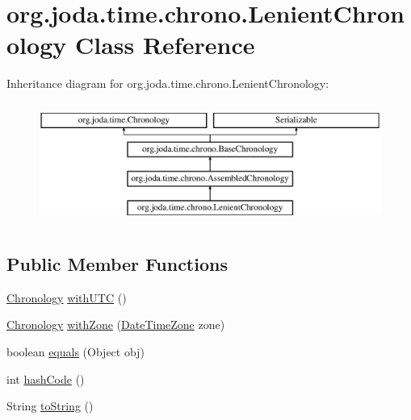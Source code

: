 \hypertarget{classorg_1_1joda_1_1time_1_1chrono_1_1_lenient_chronology}{\section{org.\-joda.\-time.\-chrono.\-Lenient\-Chronology Class Reference}
\label{classorg_1_1joda_1_1time_1_1chrono_1_1_lenient_chronology}
}
Inheritance diagram for org.\-joda.\-time.\-chrono.\-Lenient\-Chronology\-:\begin{figure}[H]
\begin{center}
\leavevmode
\includegraphics[height=4.000000cm]{classorg_1_1joda_1_1time_1_1chrono_1_1_lenient_chronology}
\end{center}
\end{figure}
\subsection*{Public Member Functions}
\begin{DoxyCompactItemize}
\item 
\hyperlink{classorg_1_1joda_1_1time_1_1_chronology}{Chronology} \hyperlink{classorg_1_1joda_1_1time_1_1chrono_1_1_lenient_chronology_aba4e10c57b7af6d29f44a432b0c737ec}{with\-U\-T\-C} ()
\item 
\hyperlink{classorg_1_1joda_1_1time_1_1_chronology}{Chronology} \hyperlink{classorg_1_1joda_1_1time_1_1chrono_1_1_lenient_chronology_aeaa022f3ad6c8d37b76a6bd7d9bb63a2}{with\-Zone} (\hyperlink{classorg_1_1joda_1_1time_1_1_date_time_zone}{Date\-Time\-Zone} zone)
\item 
boolean \hyperlink{classorg_1_1joda_1_1time_1_1chrono_1_1_lenient_chronology_ae30f5d1b051cf46bddcd122bb83a07ef}{equals} (Object obj)
\item 
int \hyperlink{classorg_1_1joda_1_1time_1_1chrono_1_1_lenient_chronology_a117456c8a71ebc4fd604057032ec60ea}{hash\-Code} ()
\item 
String \hyperlink{classorg_1_1joda_1_1time_1_1chrono_1_1_lenient_chronology_ab3731a7d9bc165185c64710d734b5d90}{to\-String} ()
\end{DoxyCompactItemize}
